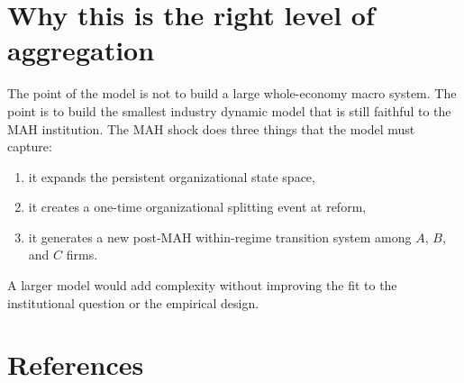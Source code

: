 \documentclass[12pt]{article}
\newcommand{\1}{\mathbf{1}}
\begin{document}
\section{Why this is the right level of aggregation}

The point of the model is not to build a large whole-economy macro system. The point is to build the smallest industry dynamic model that is still faithful to the MAH institution. The MAH shock does three things that the model must capture:
\begin{enumerate}[leftmargin=2em]
    \item it expands the persistent organizational state space,
    \item it creates a one-time organizational splitting event at reform,
    \item it generates a new post-MAH within-regime transition system among $A$, $B$, and $C$ firms.
\end{enumerate}
A larger model would add complexity without improving the fit to the institutional question or the empirical design.

\section{References}
\end{document}
